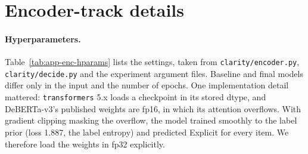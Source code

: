 \section{Encoder-track details}
\label{sec:app-encoder}

\paragraph{Hyperparameters.}
Table~\ref{tab:app-enc-hparams} lists the settings, taken from
\texttt{clarity/encoder.py}, \texttt{clarity/decide.py} and the experiment argument
files. Baseline and final models differ only in the input and the number of epochs.
One implementation detail mattered: \texttt{transformers} 5.x loads a checkpoint in
its stored dtype, and DeBERTa-v3's published weights are fp16, in which its
attention overflows. With gradient clipping masking the overflow, the model trained
smoothly to the label prior (loss 1.887, the label entropy) and predicted Explicit
for every item. We therefore load the weights in fp32 explicitly.

